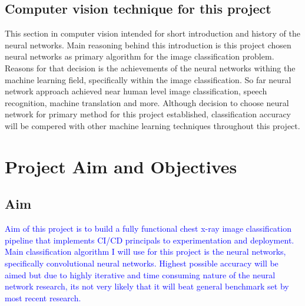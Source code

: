 \documentclass[12pt, twoside, a4paper]{article}
\begin{document}
\subsection{Computer vision technique for this project}
This section in computer vision intended for short introduction and history of the neural networks. Main reasoning behind this introduction is this project chosen neural networks as primary algorithm for the image classification problem. Reasons for that decision is the achievements of the neural networks withing the machine learning field, specifically within the image classification. So far neural network approach achieved near human level image classification, speech recognition, machine translation and more. Although decision to choose neural network for primary method for this project established, classification accuracy will be compered with other machine learning techniques throughout this project.
\clearpage

\section{Project Aim and Objectives}
\subsection{Aim}
\textcolor{blue}{Aim of this project is to build a fully functional chest x-ray image classification pipeline that implements CI/CD principals to experimentation and deployment. Main classification algorithm I will use for this project is the neural networks, specifically convolutional neural networks. Highest possible accuracy will be aimed but due to highly iterative and time consuming nature of the neural network research, its not very likely that it will beat general benchmark set by most recent research.}
\end{document}
